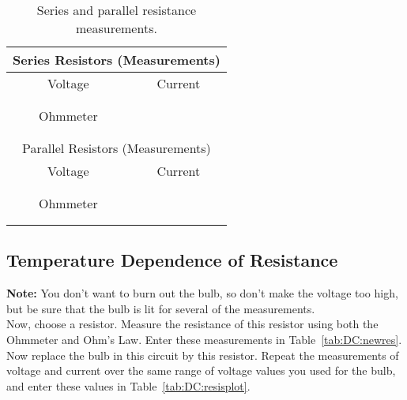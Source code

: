 \begin{table}[htb]
\begin{center}
\begin{tabular}{|c|c|}
\hline
\multicolumn{2}{|c|}{Series Resistors (Measurements)} \\
\hline 
Voltage & Current \\
\hline
\hspace*{3cm} & \hspace*{3cm}  \\ 
&  \\ 
\hline
Ohmmeter &  \\ 
\hline
&   \\
&   \\
\hline
\hline
\multicolumn{2}{|c|}{Parallel Resistors (Measurements)} \\
\hline 
Voltage & Current  \\
\hline
\hspace*{3cm} & \hspace*{3cm}  \\ 
&  \\ 
\hline
Ohmmeter &  \\
\hline
&  \\
&   \\
\hline
\hline
\end{tabular}
\end{center}
\caption{Series and parallel resistance measurements.}
\label{tab:DC:measserpar}
\end{table}

\newpage
\subsection{Temperature Dependence of Resistance}

{\bf Note:} You don't want to burn out the bulb, so don't make the voltage too
high, but be sure that the bulb is lit for several of the measurements.  \\

Now, choose a resistor.
Measure the resistance of this resistor using both the Ohmmeter and Ohm's Law.
Enter these measurements in Table~\ref{tab:DC:newres}.
Now replace the bulb in this circuit by this resistor.  
Repeat the measurements of voltage and current
over the same range of voltage values you used for the bulb, and enter these
values in Table~\ref{tab:DC:resisplot}. 


